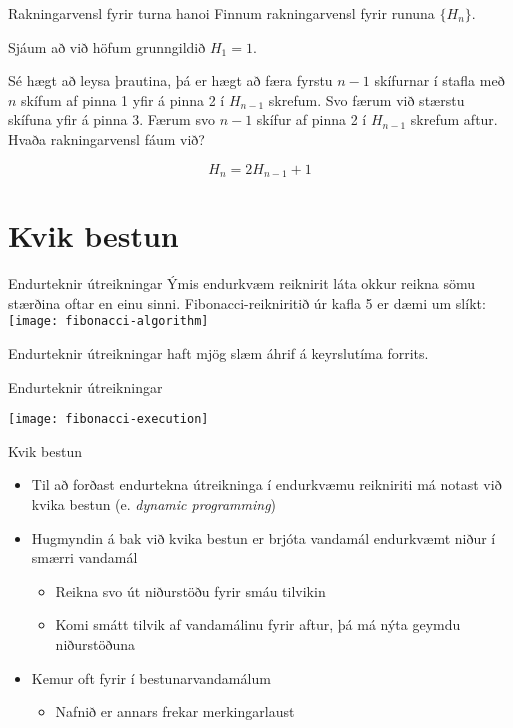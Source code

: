 \documentclass[handout]{beamer}
\begin{document}
\begin{frame}{Rakningarvensl fyrir turna hanoi}
Finnum rakningarvensl fyrir rununa $\{H_n\}$. \pause

Sjáum að við höfum grunngildið $H_1 = 1$. \pause

Sé hægt að leysa þrautina, þá er hægt að færa fyrstu $n-1$ skífurnar í stafla með $n$ skífum af pinna 1 yfir á pinna 2 í $H_{n-1}$ skrefum. Svo færum við stærstu skífuna yfir á pinna 3. Færum svo $n-1$ skífur af pinna 2 í $H_{n-1}$ skrefum aftur. Hvaða rakningarvensl fáum við? \pause

\[
 H_n = 2H_{n-1} +1
\]
\end{frame}

\section{Kvik bestun}

\begin{frame}{Endurteknir útreikningar}
Ýmis endurkvæm reiknirit láta okkur reikna sömu stærðina oftar en einu sinni. Fibonacci-reikniritið úr kafla 5 er dæmi um slíkt:
\texttt{[image: fibonacci-algorithm]}

Endurteknir útreikningar haft mjög slæm áhrif á keyrslutíma forrits.
\end{frame}

\begin{frame}{Endurteknir útreikningar}
\begin{center}
\texttt{[image: fibonacci-execution]}
\end{center}
\end{frame}

\begin{frame}{Kvik bestun}
\begin{itemize}
 \item Til að forðast endurtekna útreikninga í endurkvæmu reikniriti má notast við kvika bestun (e. \emph{dynamic programming})
 \item Hugmyndin á bak við kvika bestun er brjóta vandamál endurkvæmt niður í smærri vandamál
 \begin{itemize}
  \item Reikna svo út niðurstöðu fyrir smáu tilvikin
  \item Komi smátt tilvik af vandamálinu fyrir aftur, þá má nýta geymdu niðurstöðuna
 \end{itemize}
 \item Kemur oft fyrir í bestunarvandamálum
 \begin{itemize}
  \item Nafnið er annars frekar merkingarlaust
 \end{itemize}
\end{itemize}
\end{frame}
\end{document}
